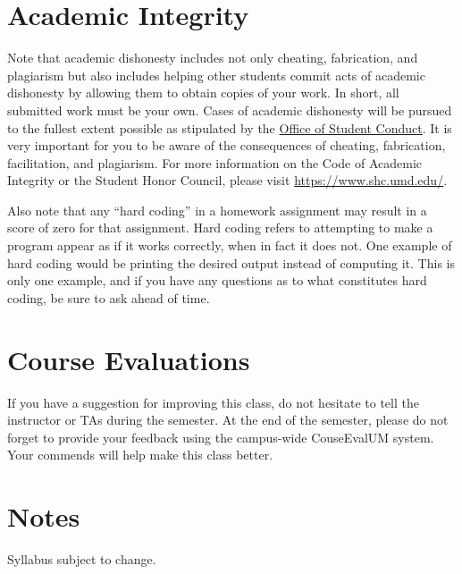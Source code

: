 \documentclass[12pt]{article}
\begin{document}
\section*{Academic Integrity}
Note that academic dishonesty includes not only cheating, fabrication, and plagiarism but also includes helping other students commit acts of academic dishonesty by allowing them to obtain copies of your work.
In short, all submitted work must be your own.
Cases of academic dishonesty will be pursued to the fullest extent possible as stipulated by the \href{https://www.studentconduct.umd.edu/}{Office of Student Conduct}.
It is very important for you to be aware of the consequences of cheating, fabrication, facilitation, and plagiarism.
For more information on the Code of Academic Integrity or the Student Honor Council, please visit \href{https://www.shc.umd.edu/}{https://www.shc.umd.edu/}.

Also note that any ``hard coding'' in a homework assignment may result in a score of zero for that assignment. Hard coding refers to attempting to make a program appear as if it works correctly, when in fact it does not. One example of hard coding would be printing the desired output instead of computing it. This is only one example, and if you have any questions as to what constitutes hard coding, be sure to ask ahead of time.

\section*{Course Evaluations}
If you have a suggestion for improving this class, do not hesitate to tell the instructor or TAs during the semester.
At the end of the semester, please do not forget to provide your feedback using the campus-wide CouseEvalUM system. Your commends will help make this class better.

\section*{Notes}
Syllabus subject to change.
\end{document}
